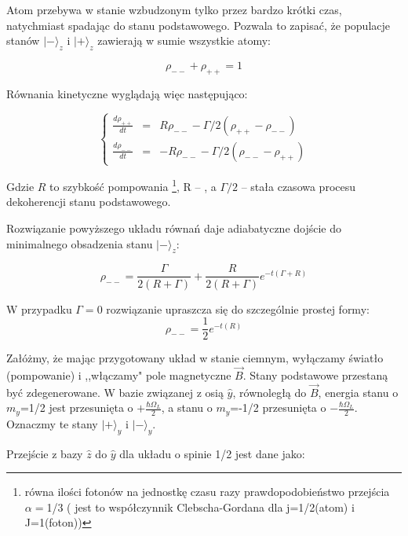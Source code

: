 \documentclass[a4paper,10pt,twoside]{report}
\begin{document}
Atom przebywa w stanie wzbudzonym tylko przez bardzo krótki czas, natychmiast spadając do stanu podstawowego. Pozwala to zapisać, że populacje stanów $\lvert - \rangle_z$ i $\lvert + \rangle_z$ zawierają w sumie wszystkie atomy:

\begin{equation}
\rho_{--}+\rho_{++}=1
\end{equation}

Równania kinetyczne wyglądają więc następująco:


\begin{equation}
\left\{
\begin{array}{rcl}
\frac{d \rho_{++}}{d t} &=&  R \rho_{--} - \Gamma/2 (\rho_{++}- \rho_{--} )\\
\frac{d \rho_{--}}{d t} &=&- R \rho_{--} - \Gamma/2(\rho_{--}- \rho_{++} )
\end{array}
\right.
\end{equation}




Gdzie $R$ to szybkość pompowania \footnote{równa ilości fotonów na jednostkę czasu razy prawdopodobieństwo przejścia  $\alpha=$1/3 ( jest to współczynnik Clebscha-Gordana dla j=1/2(atom) i J=1(foton))}, R -- , a $\Gamma/2$ -- stała czasowa procesu dekoherencji stanu podstawowego.

Rozwiązanie powyższego układu równań daje adiabatyczne dojście do minimalnego obsadzenia stanu $\lvert - \rangle_z$: \nopagebreak

\begin{equation}
\rho_{--}=\frac{\Gamma}{2(R+\Gamma)} + \frac{R}{2 (R+\Gamma)} e^{-t (\Gamma + R)}
\end{equation}

W przypadku $\Gamma=0$ rozwiązanie upraszcza się do szczególnie prostej formy:
\begin{equation}
\rho_{--}= \frac{1}{2} e^{-t ( R)}
\end{equation} 
 
Załóżmy, że mając przygotowany układ w stanie ciemnym, wyłączamy światło (pompowanie) i ,,włączamy" pole magnetyczne $\vec B$.
Stany podstawowe przestaną być zdegenerowane. W bazie związanej z osią $\hat y$, równoległą do $\vec B$, energia stanu o $m_y$=1/2 jest przesunięta o $+\frac{\hbar \Omega_L}{2}$, a stanu o $m_y$=-1/2 przesunięta o $-\frac{\hbar \Omega_L}{2}$. Oznaczmy te stany $\lvert + \rangle_y$ i $\lvert - \rangle_y$.

Przejście z bazy $\hat z$ do $\hat y$ dla układu o spinie 1/2 jest dane jako:
\end{document}
